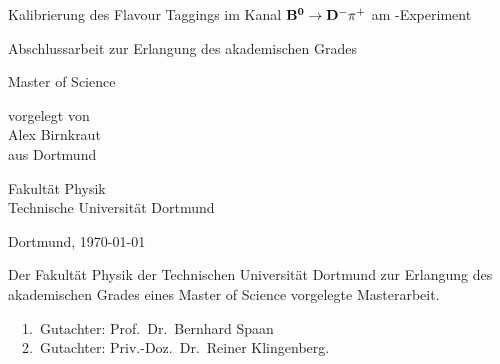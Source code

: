 
\begin{titlepage}

\vspace*{20ex}
{%
\Huge \sffamily \bfseries 
\begin{center}
Kalibrierung des Flavour Taggings im Kanal $\mathbf{{{B}^0}\rightarrow{\ensuremath{{D}^-}}{\ensuremath{{\pi}^+}}}$ am \lhcb-Experiment
\end{center} 
}%

\begin{otherlanguage}{german}
{%
\LARGE \sffamily %
\begin{center}
Abschlussarbeit zur Erlangung des akademischen Grades\\
\end{center}
}

{%
\LARGE \sffamily %
\begin{center}
Master of Science
\end{center}
}

\vspace{5ex}


{%
\Large \rmfamily
\begin{center}
vorgelegt von \\[0.8ex]
Alex Birnkraut \\[0.8ex]
aus Dortmund
\end{center}
}
\vspace{5ex}
{%
\Large \rmfamily
\begin{center}
Fakultät Physik\\
Technische Universität Dortmund
\end{center}
}
\vspace{4ex}
{%
\Large \rmfamily
\begin{center}
Dortmund, \today
\end{center}
}

\clearpage
\thispagestyle{empty}
\vspace*{\fill}
\noindent Der Fakultät Physik der Technischen Universität Dortmund zur Erlangung
des akademischen Grades eines Master of Science vorgelegte
Masterarbeit.\\

\parbox{\textwidth}{
  1.~Gutachter: Prof.~Dr.~Bernhard Spaan \\
  2.~Gutachter: Priv.-Doz.~Dr.~Reiner Klingenberg.\\
}
\end{otherlanguage}
\end{titlepage}
\setcounter{page}{1}